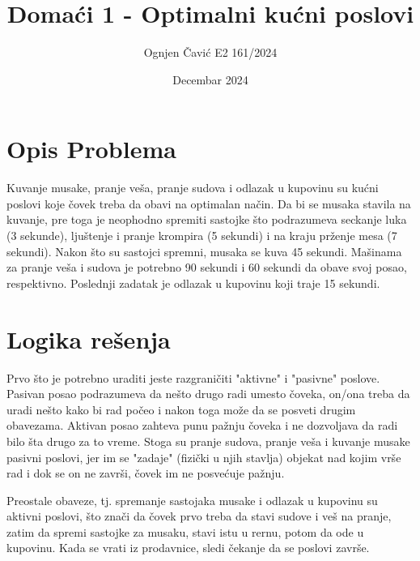 \documentclass[12pt]{article}
\title{Domaći 1 - Optimalni kućni poslovi}
\author{Ognjen Čavić E2 161/2024}
\date{Decembar 2024}
\begin{document}
\maketitle
\section{Opis Problema}
\par Kuvanje musake, pranje veša, pranje sudova i odlazak u kupovinu su kućni
poslovi koje čovek treba da obavi na optimalan način.
Da bi se musaka stavila na kuvanje, pre toga je neophodno spremiti sastojke što
podrazumeva seckanje luka (3 sekunde), ljuštenje i pranje krompira (5 sekundi)
i na kraju prženje mesa (7 sekundi).
Nakon što su sastojci spremni, musaka se kuva 45 sekundi.
Mašinama za pranje veša i sudova je potrebno 90 sekundi i 60 sekundi da obave
svoj posao, respektivno.
Poslednji zadatak je odlazak u kupovinu koji traje 15 sekundi.
\section{Logika rešenja}
\par Prvo što je potrebno uraditi jeste razgraničiti "aktivne" i "pasivne"
poslove.
Pasivan posao podrazumeva da nešto drugo radi umesto čoveka, on/ona treba
da uradi nešto kako bi rad počeo i nakon toga može da se posveti drugim obavezama.
Aktivan posao zahteva punu pažnju čoveka i ne dozvoljava da radi bilo šta drugo
za to vreme.
Stoga su pranje sudova, pranje veša i kuvanje musake pasivni poslovi, jer im se
"zadaje" (fizički u njih stavlja) objekat nad kojim vrše rad i dok se on ne
završi, čovek im ne posvećuje pažnju.
\par Preostale obaveze, tj. spremanje sastojaka musake i odlazak u kupovinu su
aktivni poslovi, što znači da čovek prvo treba da stavi sudove i veš na pranje,
zatim da spremi sastojke za musaku, stavi istu u rernu, potom da ode u kupovinu.
Kada se vrati iz prodavnice, sledi čekanje da se poslovi završe.
\end{document}
